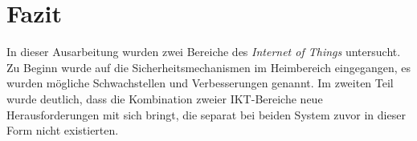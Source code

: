 \documentclass[conference]{IEEEtran}
\begin{document}
%





\section{Fazit}

In dieser Ausarbeitung wurden zwei Bereiche des \textit{Internet of Things} untersucht. Zu Beginn wurde auf die Sicherheitsmechanismen im Heimbereich eingegangen, es wurden mögliche Schwachstellen und Verbesserungen genannt. Im zweiten Teil wurde deutlich, dass die Kombination zweier IKT-Bereiche neue Herausforderungen mit sich bringt, die separat bei beiden System zuvor in dieser Form nicht existierten. 







\nocite{*}



\end{document}
